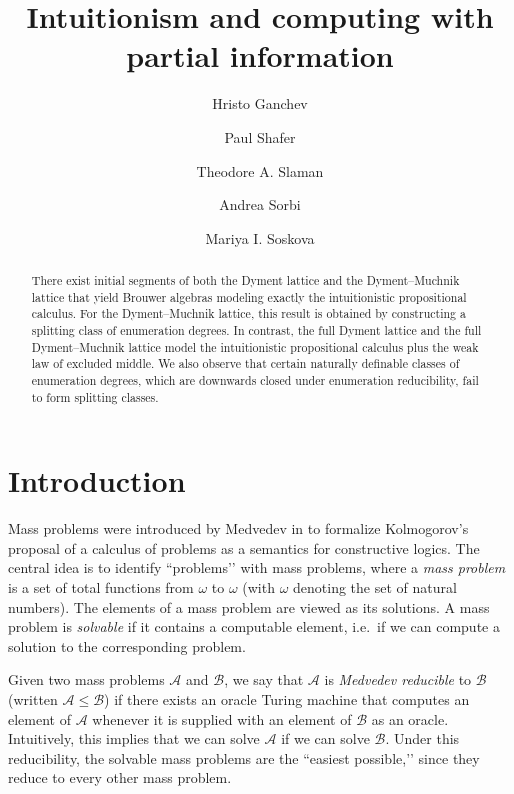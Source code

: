 \documentclass[11pt]{amsart}
\title[Intuitionism and computing with partial information]{Intuitionism
and computing with partial information}
\author[H.~Ganchev]{Hristo Ganchev}
\author[P.~Shafer]{Paul Shafer}
\author[T.~Slaman]{Theodore A. Slaman}
\author[A.~Sorbi]{Andrea Sorbi}
\author[M.~Soskova]{Mariya I. Soskova}
\newcommand{\MP}[1]{\ensuremath{\mathcal{#1}}}
\begin{document}
\begin{abstract}
There exist initial segments of both the Dyment lattice and the 
Dyment–Muchnik lattice that yield Brouwer algebras modeling exactly the 
intuitionistic propositional calculus. For the Dyment–Muchnik lattice, this 
result is obtained by constructing a splitting class of enumeration 
degrees. In contrast, the full Dyment lattice and the full Dyment–Muchnik 
lattice model the intuitionistic propositional calculus plus the weak law 
of excluded middle. We also observe that certain naturally definable 
classes of enumeration degrees, which are downwards closed under 
enumeration reducibility, fail to form splitting classes.  
\end{abstract}

\maketitle

\section{Introduction}
Mass problems were introduced by Medvedev in \cite{Medvedev} to formalize 
Kolmogorov’s proposal of a calculus of problems as a semantics for 
constructive logics. The central idea is to identify “problems’’ with mass 
problems, where a \emph{mass problem} is a set of total functions from 
$\omega$ to $\omega$ (with $\omega$ denoting the set of natural numbers). The 
elements of a mass problem are viewed as its solutions. A mass problem is 
\emph{solvable} if it contains a computable element, i.e.\ if we can compute 
a solution to the corresponding problem. 

Given two mass problems $\MP{A}$ and $\MP{B}$, we say that $\MP{A}$ is 
\emph{Medvedev reducible} to $\MP{B}$ (written $\MP{A} \leq \MP{B}$) if there 
exists an oracle Turing machine that computes an element of $\MP{A}$ whenever 
it is supplied with an element of $\MP{B}$ as an oracle. Intuitively, this 
implies that we can solve $\MP{A}$ if we can solve $\MP{B}$. Under this 
reducibility, the solvable mass problems are the “easiest possible,’’ since 
they reduce to every other mass problem. 
\end{document}
